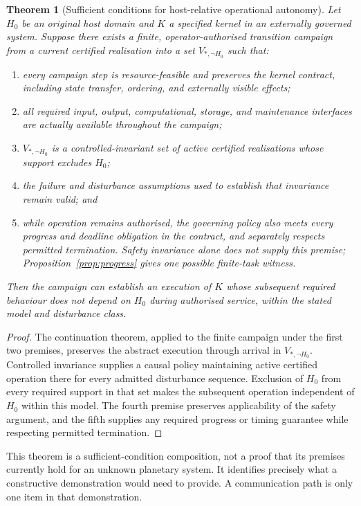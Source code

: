 \documentclass[11pt,a4paper]{article}
\newtheorem{theorem}{Theorem}[section]
\theoremstyle{definition}
\theoremstyle{remark}
\newcommand{\calK}{K}
\begin{document}
\begin{theorem}[Sufficient conditions for host-relative operational autonomy]\label{thm:autonomy}
Let $H_0$ be an original host domain and $\calK$ a specified kernel in an externally governed system. Suppose there exists a finite, operator-authorised transition campaign from a current certified realisation into a set $V_{*,\neg H_0}$ such that:
\begin{enumerate}
 \item every campaign step is resource-feasible and preserves the kernel contract, including state transfer, ordering, and externally visible effects;
 \item all required input, output, computational, storage, and maintenance interfaces are actually available throughout the campaign;
 \item $V_{*,\neg H_0}$ is a controlled-invariant set of active certified realisations whose support excludes $H_0$;
 \item the failure and disturbance assumptions used to establish that invariance remain valid; and
 \item while operation remains authorised, the governing policy also meets every progress and deadline obligation in the contract, and separately respects permitted termination. Safety invariance alone does not supply this premise; Proposition~\ref{prop:progress} gives one possible finite-task witness.
\end{enumerate}
Then the campaign can establish an execution of $\calK$ whose subsequent required behaviour does not depend on $H_0$ during authorised service, within the stated model and disturbance class.
\end{theorem}
\begin{proof}
The continuation theorem, applied to the finite campaign under the first two premises, preserves the abstract execution through arrival in $V_{*,\neg H_0}$. Controlled invariance supplies a causal policy maintaining active certified operation there for every admitted disturbance sequence. Exclusion of $H_0$ from every required support in that set makes the subsequent operation independent of $H_0$ within this model. The fourth premise preserves applicability of the safety argument, and the fifth supplies any required progress or timing guarantee while respecting permitted termination.
\end{proof}
This theorem is a sufficient-condition composition, not a proof that its premises currently hold for an unknown planetary system. It identifies precisely what a constructive demonstration would need to provide. A communication path is only one item in that demonstration.
\end{document}
